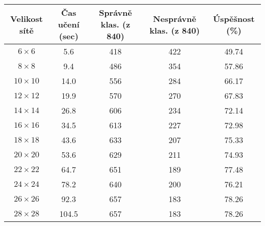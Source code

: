 \documentclass[11pt]{article}
\begin{document}
\begin{center}
	\begin{tabular}{|c c c c c|} 
		\hline
		Velikost sítě & Čas učení (sec) & Správně klas. (z 840) & Nesprávně klas. (z 840) & Úspěšnost (\%) \\ [0.5ex] 
		\hline
		\hline
		$6\times6$ & 5.6 & 418 & 422 & 49.74 \\ 
		\hline
		$8\times8$ & 9.4 & 486 & 354 & 57.86 \\
		\hline
		$10\times10$ & 14.0 & 556 & 284 & 66.17  \\
		\hline
		$12\times12$ & 19.9 & 570 & 270 & 67.83 \\
		\hline
		$14\times14$ & 26.8 & 606 & 234 & 72.14 \\
		\hline
		$16\times16$ & 34.5 & 613 & 227 & 72.98 \\
		\hline
		$18\times18$ & 43.6 & 633 & 207 & 75.33 \\
		\hline
		$20\times20$ & 53.6 & 629 & 211 & 74.93 \\
		\hline
		$22\times22$ & 64.7 & 651 & 189 & 77.48 \\
		\hline
		$24\times24$ & 78.2 & 640 & 200 & 76.21 \\
		\hline
		$26\times26$ & 92.3 & 657 & 183 & 78.26 \\
		\hline
		$28\times28$ & 104.5 & 657 & 183 & 78.26 \\
		\hline
	\end{tabular}
\end{center}
\end{document}
